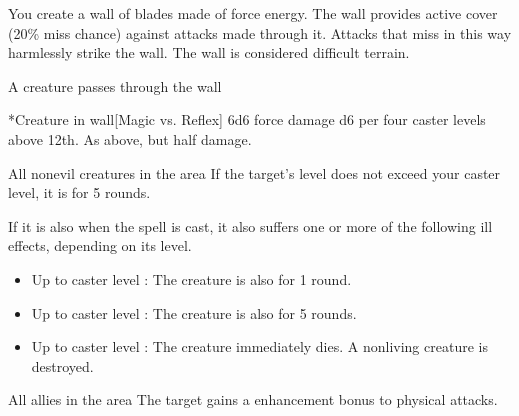 \spelldur{\durshort \dismissable}
\spellline
\spelleffect You create a wall of blades made of force energy. The wall provides active cover (20\% miss chance) against attacks made through it. Attacks that miss in this way harmlessly strike the wall. The wall is considered difficult terrain.
\begin{spelltrigger}{A creature passes through the wall}
    \begin{spelltargets}*{Creature in wall}[Magic vs. Reflex]
        \spellsuccess 6d6 force damage \add d6 per four caster levels above 12th.
        \spellfailure As above, but half damage.
    \end{spelltargets}
\end{spelltrigger}

\begin{spelltargets}{All nonevil creatures in the area}
    \spelleffect If the target's level does not exceed your caster level, it is \sickened for 5 rounds.

    If it is also \bloodied when the spell is cast, it also suffers one or more of the following ill effects, depending on its level.
    \begin{itemize}
        \item Up to caster level : The creature is also \nauseated for 1 round.
        \item Up to caster level : The creature is also \paralyzed for 5 rounds.
        \item Up to caster level : The creature immediately dies. A nonliving creature is destroyed.
    \end{itemize}
\end{spelltargets}

\begin{spelltargets}{All allies in the area}
    \spelleffect The target gains a  enhancement bonus to physical attacks. \spellbonusscalingdescription
\end{spelltargets}

